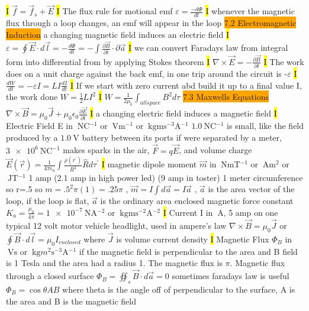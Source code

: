 \documentclass[fontsize=4pt]{scrartcl}
\begin{document}
\hl{I}
$\vec{f} = \vec{f}_s + \vec{E}$
\hl{I}
The flux rule for motional emf $\varepsilon = \frac{-d\Phi}{dt}$
\hl{I}
whenever the magnetic flux through a loop changes, an emf will appear in the loop
\colorbox{Orange}{7.2 Electromagnetic Induction}
a changing magnetic field induces an electric field
\hl{I}
$\varepsilon = \oint \vec{E} \cdot d\vec{l} = -\frac{d\Phi}{dt} = -\int \frac{\partial \vec{B}}{\partial t} \cdot \partial \vec{a}$
\hl{I}
we can convert Faradays law from integral form into differential from by applying Stokes theorem
\hl{I}
$\nabla \times \vec{E} = - \frac{\partial \vec{B}}{\partial t}$
\hl{I}
The work does on a unit charge against the back emf, in one trip around the circuit is -$\varepsilon$
\hl{I}
$\frac{dW}{dt} = - \varepsilon I = LI \frac{dI}{dt}$
\hl{I}
If we start with zero current abd build it up to a final value I, the work done $W = \frac{1}{2}LI^2$
\hl{I}
$W = \frac{1}{2\mu_0} \int_{all space} B^2 d\tau$
\colorbox{Orange}{7.3 Maxwells Equations}
$\nabla \times \vec{B} = \mu_0 \vec{J} + \mu_0 \epsilon_0 \frac{\partial \vec{E}}{\partial t}$
\hl{I}
a changing electric field induces a magnetic field
\hl{I}
Electric Field E  in $\SI{}{\newton \coulomb^{-1}}$ or $\SI{}{\volt \meter^{-1}}$ or $\SI{}{\kilogram \meter \second^{-3}\ampere^{-1}}$ 
$\SI{1.0}{\newton \coulomb^{-1}}$ is small, like the field produced by a $\SI{1.0}{\volt}$ battery between its ports if were separated by a meter, $\SI{3 e6}{\newton \coulomb^{-1}}$ makes sparks in the air, $\vec{F} = q\vec{E}$, and volume charge $\vec{E}(\vec{r}) = \frac{1}{4\pi\epsilon_0}\int \frac{\rho (r^{\prime})}{R^2} \hat{R} d\tau^{\prime}$
\hl{I}
\colorbox{RubineRed}{magnetic dipole moment} $\vec{m}$ in $\SI{}{\newton \meter \tesla^{-1}}$ or $\SI{}{\ampere \meter^2}$ or $\SI{}{\joule \tesla^{-1}}$  1 amp (2.1 amp in high power led) (9 amp in toster) 1 meter circumference so r=.5 so $m=.5^2 \pi (1) = .25 \pi$ , $\vec{m} = I \int d\vec{a} = I\vec{a}$ , $\vec{a}$ is the area vector of the loop, if the loop is flat, $\vec{a}$ is the ordinary area enclosed
\colorbox{RubineRed}{magnetic force constant} $K_a = \frac{\mu_0}{4\pi} =\SI{1e-7}{\newton \ampere^{-2}}$ or $\SI{}{\kilogram \meter \second^{-2} \ampere^{-2}}$ 
\hl{I} 
\colorbox{RubineRed}{Current} I in $\SI{}{ \ampere}$, 5 amp on one typical 12 volt motor vehicle headlight, used in ampere's law $\nabla \times \vec{B} =\mu_0 \vec{J}$ or $\oint \vec{B} \cdot d\vec{l} = \mu_0 I_{enclosed}$ where $\vec{J}$ is volume current density
\hl{I}
\colorbox{RubineRed}{Magnetic Flux} $\Phi_{B}$ in $\SI{}{ \volt \second}$ or $\SI{}{ \kilogram m^2 \second^{-3}\ampere^{-1}}$ if the magnetic field is perpendicular to the area and B field is 1 Tesla and the area had a radius 1. The magnetic flux is $\pi$. Magnetic flux through a closed surface $\Phi_{B} =\oiint_s \vec{B} \cdot d\vec{a} = 0$ sometimes faradays law is useful $\Phi_B = \cos \theta AB$ where theta is the angle off of perpendicular to the surface, A is the area and B is the magnetic field
\end{document}
